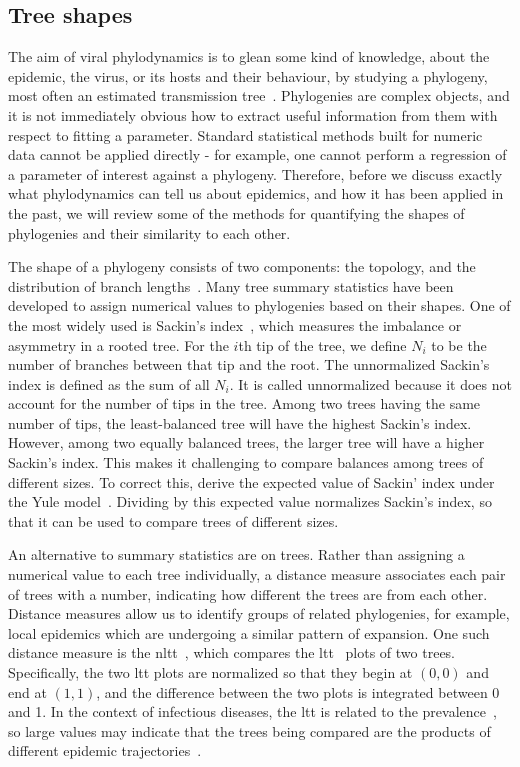 \subsection{Tree shapes}
\label{subsubsec:treeshape}

The aim of viral phylodynamics is to glean some kind of knowledge, about the
epidemic, the virus, or its hosts and their behaviour, by studying a phylogeny,
most often an estimated transmission tree~\autocite{pybus2009evolutionary,
volz2013viral}. Phylogenies are complex objects, and it is not immediately
obvious how to extract useful information from them with respect to fitting a
parameter. Standard statistical methods built for numeric data cannot be
applied directly - for example, one cannot perform a regression of a parameter
of interest against a phylogeny. Therefore, before we discuss exactly what
phylodynamics can tell us about epidemics, and how it has been applied in the
past, we will review some of the methods for quantifying the shapes of
phylogenies and their similarity to each other.

The shape of a phylogeny consists of two components: the topology, and the
distribution of branch lengths~\autocite{mooers1997inferring}. Many tree
summary statistics have been developed to assign numerical values to
phylogenies based on their shapes. One of the most widely used is Sackin's
index~\autocite{shao1990tree}, which measures the imbalance or asymmetry in a
rooted tree. For the $i$th tip of the tree, we define $N_i$ to be the number of
branches between that tip and the root. The unnormalized Sackin's index is
defined as the sum of all $N_i$. It is called unnormalized because it does not
account for the number of tips in the tree. Among two trees having the same
number of tips, the least-balanced tree will have the highest Sackin's index.
However, among two equally balanced trees, the larger tree will have a higher
Sackin's index. This makes it challenging to compare balances among trees of
different sizes. To correct this, \textcite{kirkpatrick1993searching} derive
the expected value of Sackin' index under the Yule
model~\autocite{yule1925mathematical}. Dividing by this expected value
normalizes Sackin's index, so that it can be used to compare trees of different
sizes.

An alternative to summary statistics are  on trees.
Rather than assigning a numerical value to each tree individually, a distance
measure associates each pair of trees with a number, indicating how different
the trees are from each other. Distance measures allow us to identify groups of
related phylogenies, for example, local epidemics which are undergoing a
similar pattern of expansion. One such distance measure is the
\gls{nltt}~\autocite{janzen2015approximate}, which compares the
\gls{ltt}~\autocite{nee1992tempo} plots of two trees. Specifically, the two
\gls{ltt} plots are normalized so that they begin at $(0, 0)$ and end at $(1,
1)$, and the difference between the two plots is integrated between 0 and 1. In
the context of infectious diseases, the \gls{ltt} is related to the
prevalence~\autocite{holmes1995revealing}, so large values may indicate that
the trees being compared are the products of different epidemic
trajectories~\autocite{janzen2015approximate}.

